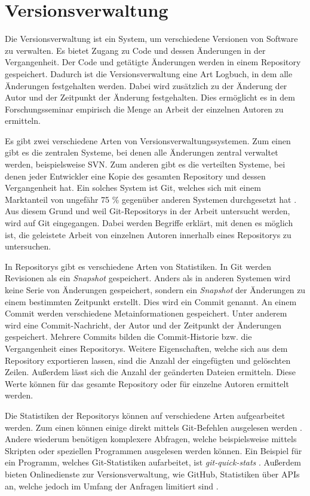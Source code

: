 \section{Versionsverwaltung}
\label{sec:versionsverwaltung}
Die Versionsverwaltung ist ein System, um verschiedene Versionen von Software zu verwalten.
Es bietet Zugang zu Code und dessen Änderungen in der Vergangenheit.
Der Code und getätigte Änderungen werden in einem Repository gespeichert.
Dadurch ist die Versionsverwaltung eine Art Logbuch, in dem alle Änderungen festgehalten werden.
Dabei wird zusätzlich zu der Änderung der Autor und der Zeitpunkt der Änderung festgehalten.
Dies ermöglicht es in dem Forschungsseminar empirisch die Menge an Arbeit der einzelnen Autoren zu ermitteln. \autocite{ponuthorai_version_2022}

Es gibt zwei verschiedene Arten von Versionsverwaltungssystemen.
Zum einen gibt es die zentralen Systeme, bei denen alle Änderungen zentral verwaltet werden, beispielsweise SVN.
Zum anderen gibt es die verteilten Systeme, bei denen jeder Entwickler eine Kopie des gesamten Repository und dessen Vergangenheit hat.
Ein solches System ist Git, welches sich mit einem Marktanteil von ungefähr 75 \% gegenüber anderen Systemen durchgesetzt hat \autocite{lindner_version_2024}.
Aus diesem Grund und weil Git-Repositorys in der Arbeit untersucht werden, wird auf Git eingegangen.
Dabei werden Begriffe erklärt, mit denen es möglich ist, die geleistete Arbeit von einzelnen Autoren innerhalb eines Repositorys zu untersuchen. \autocite{ponuthorai_version_2022}

In Repositorys gibt es verschiedene Arten von Statistiken.
In Git werden Revisionen als ein \emph{Snapshot} gespeichert.
Anders als in anderen Systemen wird keine Serie von Änderungen gespeichert, sondern ein \emph{Snapshot} der Änderungen zu einem bestimmten Zeitpunkt erstellt.
Dies wird ein Commit genannt.
An einem Commit werden verschiedene Metainformationen gespeichert.
Unter anderem wird eine Commit-Nachricht, der Autor und der Zeitpunkt der Änderungen gespeichert.
Mehrere Commits bilden die Commit-Historie bzw. die Vergangenheit eines Repositorys.
Weitere Eigenschaften, welche sich aus dem Repository exportieren lassen, sind die Anzahl der eingefügten und gelöschten Zeilen.
Außerdem lässt sich die Anzahl der geänderten Dateien ermitteln.
Diese Werte können für das gesamte Repository oder für einzelne Autoren ermittelt werden. \autocite{ponuthorai_version_2022}

Die Statistiken der Repositorys können auf verschiedene Arten aufgearbeitet werden.
Zum einen können einige direkt mittels Git-Befehlen ausgelesen werden \autocite{chacon_git_2024}.
Andere wiederum benötigen komplexere Abfragen, welche beispielsweise mittels Skripten oder speziellen Programmen ausgelesen werden können.
Ein Beispiel für ein Programm, welches Git-Statistiken aufarbeitet, ist \emph{git-quick-stats} \autocite{mestan_git-quick-stats_2024}.
Außerdem bieten Onlinedienste zur Versionsverwaltung, wie GitHub, Statistiken über APIs an, welche jedoch im Umfang der Anfragen limitiert sind \autocite{github_rate_2022}.
